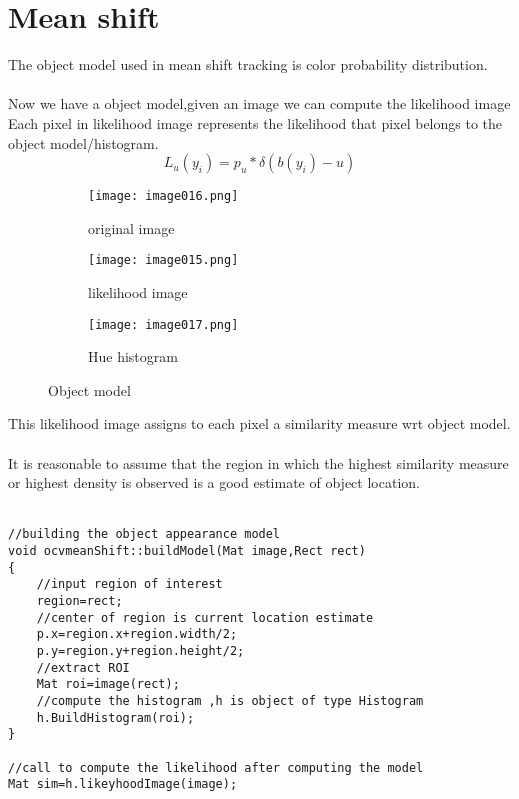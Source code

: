 \documentclass[fontsize=12pt, %
                             paper=a4, %
                             oneside, %
                             captions=tableheading,
                             index=totoc,
                             hyperref]{labbook}
\begin{document}
\section{Mean shift}
The object model used in mean shift tracking  is color probability distribution.
\\\\
Now we have a object model,given an image we can compute the likelihood image
Each pixel in likelihood image represents the likelihood that pixel belongs
to the object model/histogram.
\[
 L_u(y_i) = p_u*\delta(b(y_i)-u)
\]
\begin{figure}[!htbp]
\begin{subfigure}[b]{0.3\textwidth}
                \centering
                \texttt{[image: image016.png]}
                \caption{original image}                
        \end{subfigure}%
  \begin{subfigure}[b]{0.3\textwidth}
                \centering
                \texttt{[image: image015.png]}
                \caption{likelihood image}                
        \end{subfigure}%
  \begin{subfigure}[b]{0.3\textwidth}
                \centering
                \texttt{[image: image017.png]}
                \caption{Hue histogram}                
        \end{subfigure}%

        \caption{Object model}\label{fig:image1}
\end{figure}
This likelihood image assigns to each pixel a similarity measure wrt object model.
\\\\
It is reasonable to assume that the region in which the highest similarity measure 
or highest density is observed is a good estimate of object location.
\\\\
\begin{verbatim}
//building the object appearance model
void ocvmeanShift::buildModel(Mat image,Rect rect)
{
    //input region of interest
    region=rect;
    //center of region is current location estimate
    p.x=region.x+region.width/2;
    p.y=region.y+region.height/2;
    //extract ROI
    Mat roi=image(rect);    
    //compute the histogram ,h is object of type Histogram
    h.BuildHistogram(roi);
}

//call to compute the likelihood after computing the model
Mat sim=h.likeyhoodImage(image);
    
\end{verbatim}
\end{document}
